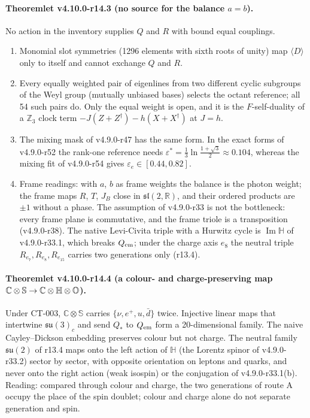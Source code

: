 \paragraph{Theoremlet v4.10.0-r14.3 (no source for the balance \(a=b\)).}
No action in the inventory supplies \(Q\) and \(R\) with bound equal couplings.
\begin{enumerate}[leftmargin=2em]
\item[(a)] Monomial slot symmetries (1296 elements with sixth roots of unity) map \(\langle D\rangle\) only to itself and cannot
exchange \(Q\) and \(R\).
\item[(b)] Every equally weighted pair of eigenlines from two different cyclic subgroups of the Weyl group (mutually
unbiased bases) selects the octant reference; all 54 such pairs do.  Only the equal weight is open, and it is the
\(F\)-self-duality of a \(\mathbb Z_3\) clock term \(-J(Z+Z^\dagger)-h(X+X^\dagger)\) at \(J=h\).
\item[(c)] The mixing mask of v4.9.0-r47 has the same form.  In the exact forms of v4.9.0-r52 the rank-one reference
needs \(\varepsilon^*=\tfrac13\ln\frac{1+\sqrt3}{2}\approx0.104\), whereas the mixing fit of v4.9.0-r54 gives
\(\varepsilon_e\in[0.44,0.82]\).
\item[(d)] Frame readings: with \(a\), \(b\) as frame weights the balance is the photon weight; the frame maps \(R\), \(T\),
\(J_B\) close in \(\mathfrak{sl}(2,\mathbb R)\), and their ordered products are \(\pm1\) without a phase.  The assumption of
v4.9.0-r33 is not the bottleneck: every frame plane is commutative, and the frame triole is a transposition (v4.9.0-r38).
The native Levi-Civita triple with a Hurwitz cycle is \(\operatorname{Im}\mathbb H\) of v4.9.0-r33.1, which breaks \(Q_{\rm em}\);
under the charge axis \(e_8\) the neutral triple \(R_{e_7},R_{e_8},R_{e_{15}}\) carries two generations only (r13.4).
\end{enumerate}

\paragraph{Theoremlet v4.10.0-r14.4 (a colour- and charge-preserving map \(\mathbb C\otimes\mathbb S\to\mathbb C\otimes\mathbb H\otimes\mathbb{O}\)).}
Under CT-003, \(\mathbb C\otimes\mathbb S\) carries \(\{\nu,e^+,u,\bar d\}\) twice.  Injective linear maps that intertwine
\(\mathfrak{su}(3)_c\) and send \(Q_*\) to \(Q_{\rm em}\) form a 20-dimensional family.  The naive Cayley--Dickson embedding
preserves colour but not charge.  The neutral family \(\mathfrak{su}(2)\) of r13.4 maps onto the left action of \(\mathbb H\) (the
Lorentz spinor of v4.9.0-r33.2) sector by sector, with opposite orientation on leptons and quarks, and never onto the right
action (weak isospin) or the conjugation of v4.9.0-r33.1(b).  Reading: compared through colour and charge, the two
generations of route A occupy the place of the spin doublet; colour and charge alone do not separate generation and spin.

